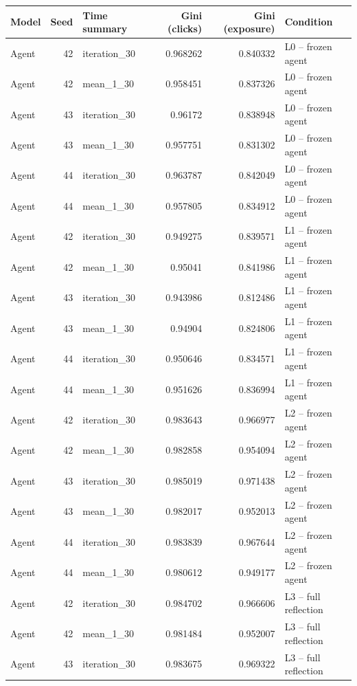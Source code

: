 \begin{table}[htbp!]
\centering
\small
\setlength{\tabcolsep}{3pt}
\renewcommand{\arraystretch}{1.1}
\begin{tabular}{lrlrrl}
\hline
Model & Seed & Time summary & Gini (clicks) & Gini (exposure) & Condition \\
\hline
Agent & 42 & iteration\_30 & 0.968262 & 0.840332 & L0 -- frozen agent \\
Agent & 42 & mean\_1\_30 & 0.958451 & 0.837326 & L0 -- frozen agent \\
Agent & 43 & iteration\_30 & 0.96172 & 0.838948 & L0 -- frozen agent \\
Agent & 43 & mean\_1\_30 & 0.957751 & 0.831302 & L0 -- frozen agent \\
Agent & 44 & iteration\_30 & 0.963787 & 0.842049 & L0 -- frozen agent \\
Agent & 44 & mean\_1\_30 & 0.957805 & 0.834912 & L0 -- frozen agent \\
Agent & 42 & iteration\_30 & 0.949275 & 0.839571 & L1 -- frozen agent \\
Agent & 42 & mean\_1\_30 & 0.95041 & 0.841986 & L1 -- frozen agent \\
Agent & 43 & iteration\_30 & 0.943986 & 0.812486 & L1 -- frozen agent \\
Agent & 43 & mean\_1\_30 & 0.94904 & 0.824806 & L1 -- frozen agent \\
Agent & 44 & iteration\_30 & 0.950646 & 0.834571 & L1 -- frozen agent \\
Agent & 44 & mean\_1\_30 & 0.951626 & 0.836994 & L1 -- frozen agent \\
Agent & 42 & iteration\_30 & 0.983643 & 0.966977 & L2 -- frozen agent \\
Agent & 42 & mean\_1\_30 & 0.982858 & 0.954094 & L2 -- frozen agent \\
Agent & 43 & iteration\_30 & 0.985019 & 0.971438 & L2 -- frozen agent \\
Agent & 43 & mean\_1\_30 & 0.982017 & 0.952013 & L2 -- frozen agent \\
Agent & 44 & iteration\_30 & 0.983839 & 0.967644 & L2 -- frozen agent \\
Agent & 44 & mean\_1\_30 & 0.980612 & 0.949177 & L2 -- frozen agent \\
Agent & 42 & iteration\_30 & 0.984702 & 0.966606 & L3 -- full reflection \\
Agent & 42 & mean\_1\_30 & 0.981484 & 0.952007 & L3 -- full reflection \\
Agent & 43 & iteration\_30 & 0.983675 & 0.969322 & L3 -- full reflection \\

\end{tabular}
\end{table}
